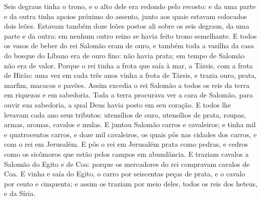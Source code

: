 {  Seis degraus tinha o trono, e o alto dele era redondo pelo recosto: e da uma parte e da outra tinha apoios próximo do assento, junto aos quais estavam colocados dois leões.
  Estavam também doze leões postos ali sobre os seis degraus, da uma parte e da outra: em nenhum outro reino se havia feito trono semelhante.
  E todos os vasos de beber do rei Salomão eram de ouro, e também toda a vasilha da casa do bosque do Líbano era de ouro fino: não havia prata; em tempo de Salomão não era de valor.
  Porque o rei tinha a frota que saía à mar, a Társis, com a frota de Hirão: uma vez em cada três anos vinha a frota de Társis, e trazia ouro, prata, marfim, macacos e pavões.
  Assim excedia o rei Salomão a todos os reis da terra em riquezas e em sabedoria.
  Toda a terra procurava ver a cara de Salomão, para ouvir sua sabedoria, a qual Deus havia posto em seu coração.
  E todos lhe levavam cada ano seus tributos: utensílios de ouro, utensílios de prata, roupas, armas, aromas, cavalos e mulas.
  E juntou Salomão carros e cavaleiros; e tinha mil e quatrocentos carros, e doze mil cavaleiros, os quais pôs nas cidades dos carros, e com o rei em Jerusalém.
  E pôs o rei em Jerusalém prata como pedras, e cedros como os sicômoros que estão pelos campos em abundância.
  E traziam cavalos a Salomão do Egito e de Coa: porque os mercadores do rei compravam cavalos de Coa.
  E vinha e saía do Egito, o carro por seiscentas peças de prata, e o cavalo por cento e cinquenta; e assim os traziam por meio deles, todos os reis dos heteus, e da Síria.
\par }

